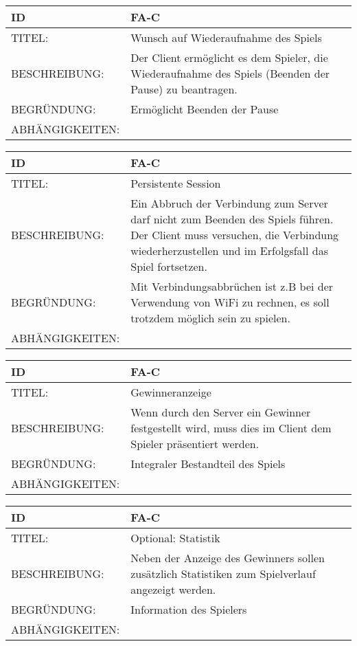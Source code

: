 \begin{tabularx}{16cm}{l|X}
\textbf{ID} & \textbf{FA-C} \\
\hline
TITEL: & Wunsch auf Wiederaufnahme des Spiels \\
\hline 
BESCHREIBUNG: & Der Client ermöglicht es dem Spieler, die Wiederaufnahme des Spiels (Beenden der Pause) zu beantragen. \\
\hline
BEGRÜNDUNG: & Ermöglicht Beenden der Pause \\
\hline
ABHÄNGIGKEITEN: & \\
\end{tabularx}

\begin{tabularx}{16cm}{l|X}
\textbf{ID} & \textbf{FA-C} \\
\hline
TITEL: & Persistente Session \\
\hline 
BESCHREIBUNG: & Ein Abbruch der Verbindung zum Server darf nicht zum Beenden des Spiels führen. Der Client muss versuchen, die Verbindung wiederherzustellen und im Erfolgsfall das Spiel fortsetzen. \\
\hline
BEGRÜNDUNG: & Mit Verbindungsabbrüchen ist z.B bei der Verwendung von WiFi zu rechnen, es soll trotzdem möglich sein zu spielen. \\
\hline
ABHÄNGIGKEITEN: & \\
\end{tabularx}

\begin{tabularx}{16cm}{l|X}
\textbf{ID} & \textbf{FA-C} \\
\hline
TITEL: & Gewinneranzeige \\
\hline 
BESCHREIBUNG: & Wenn durch den Server ein Gewinner festgestellt wird, muss dies im Client dem Spieler präsentiert werden. \\
\hline
BEGRÜNDUNG: & Integraler Bestandteil des Spiels \\
\hline
ABHÄNGIGKEITEN: & \\
\end{tabularx}

\begin{tabularx}{16cm}{l|X}
\textbf{ID} & \textbf{FA-C} \\
\hline
TITEL: & Optional: Statistik \\
\hline 
BESCHREIBUNG: & Neben der Anzeige des Gewinners sollen zusätzlich Statistiken zum Spielverlauf angezeigt werden. \\
\hline
BEGRÜNDUNG: & Information des Spielers \\
\hline
ABHÄNGIGKEITEN: & \\
\end{tabularx}

